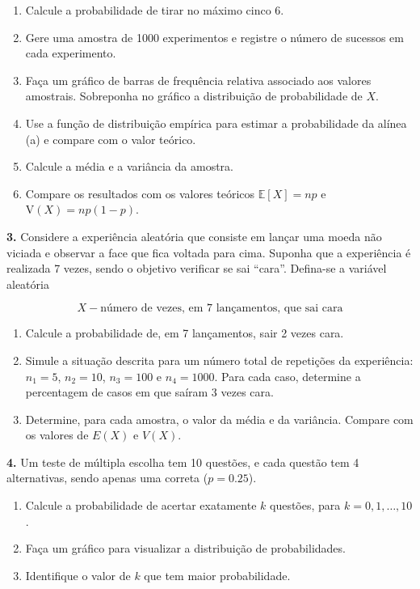 \documentclass[
]{book}
\providecommand{\tightlist}{%
  \setlength{\itemsep}{0pt}\setlength{\parskip}{0pt}}
\begin{document}
\begin{enumerate}
\def\labelenumi{(\alph{enumi})}
\tightlist
\item
  Calcule a probabilidade de tirar no máximo cinco 6.
\item
  Gere uma amostra de 1000 experimentos e registre o número de sucessos em cada experimento.
\item
  Faça um gráfico de barras de frequência relativa associado aos valores amostrais. Sobreponha no gráfico a distribuição de probabilidade de \(X\).
\item
  Use a função de distribuição empírica para estimar a probabilidade da alínea (a) e compare com o valor teórico.
\item
  Calcule a média e a variância da amostra.
\item
  Compare os resultados com os valores teóricos \(\mathbb{E}[X] = np\) e \(\text{V}(X) = np(1-p)\).
\end{enumerate}

\textbf{3.} Considere a experiência aleatória que consiste em lançar
uma moeda não viciada e observar a face que fica voltada para cima.
Suponha que a experiência é realizada 7 vezes, sendo o objetivo
verificar se sai ``cara''. Defina-se a variável aleatória

\[X - \text{número de vezes, em 7 lançamentos, que sai cara}\]

\begin{enumerate}
\def\labelenumi{(\alph{enumi})}
\item
  Calcule a probabilidade de, em 7 lançamentos, sair 2 vezes cara.
\item
  Simule a situação descrita para um número total de repetições da
  experiência: \(n_1=5\), \(n_2=10\), \(n_3=100\) e \(n_4=1000\). Para cada
  caso, determine a percentagem de casos em que saíram 3 vezes cara.
\item
  Determine, para cada amostra, o valor da média e da variância.
  Compare com os valores de \(E(X)\) e \(V(X)\).
\end{enumerate}

\textbf{4.} Um teste de múltipla escolha tem 10 questões, e cada questão tem 4 alternativas, sendo apenas uma correta (\(p = 0.25\)).

\begin{enumerate}
\def\labelenumi{(\alph{enumi})}
\tightlist
\item
  Calcule a probabilidade de acertar exatamente \(k\) questões, para \(k = 0, 1, \ldots, 10\).
\item
  Faça um gráfico para visualizar a distribuição de probabilidades.
\item
  Identifique o valor de \(k\) que tem maior probabilidade.
\end{enumerate}
\end{document}
